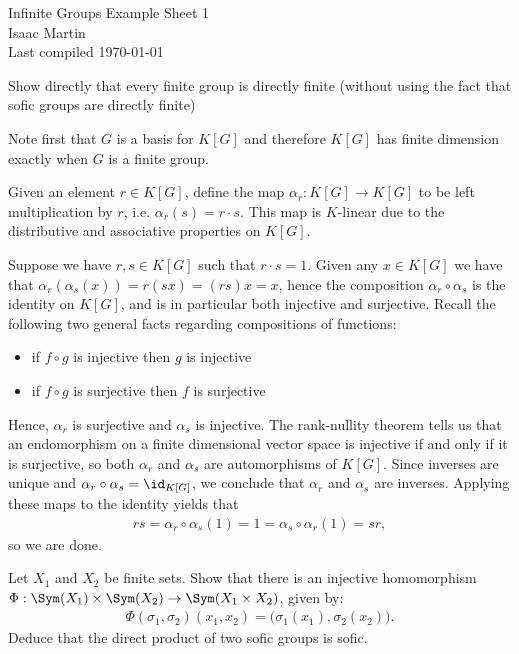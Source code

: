 


\pagestyle{empty}
	\LARGE
\begin{center}
	Infinite Groups Example Sheet 1 \\
	\Large
	Isaac Martin \\
    Last compiled \today
\end{center}
\normalsize
\vspace{-2mm}
\hru
{}
\begin{homework}[e]
	\prob Show directly that every finite group is directly finite (without using the fact that sofic groups are directly finite)
	\begin{prf}
		Note first that $G$ is a basis for $K[G]$ and therefore $K[G]$ has finite dimension exactly when $G$ is a finite group.

		Given an element $r \in K[G]$, define the map $\alpha_r:K[G]\to K[G]$ to be left multiplication by $r$, i.e. $\alpha_r(s) = r\cdot s$. This map is $K$-linear due to the distributive and associative properties on $K[G]$. 

		Suppose we have  $r,s\in K[G]$ such that $r\cdot s = 1$. Given any $x \in K[G]$ we have that $\alpha_r(\alpha_s(x)) = r(sx) = (rs)x = x$, hence the composition $\alpha_r\circ \alpha_s$ is the identity on $K[G]$, and is in particular both injective and surjective. Recall the following two general facts regarding compositions of functions:
		\begin{itemize}
			\item if $f\circ g$ is injective then $g$ is injective
			\item if $f\circ g$ is surjective then $f$ is surjective
		\end{itemize}
		Hence, $\alpha_r$ is surjective and $\alpha_s$ is injective. The rank-nullity theorem tells us that an endomorphism on a finite dimensional vector space is injective if and only if it is surjective, so both $\alpha_r$ and $\alpha_s$ are automorphisms of  $K[G]$. Since inverses are unique and $\alpha_r \circ \alpha_s = \id_{K[G]}$, we conclude that $\alpha_r$ and $\alpha_s$ are inverses. Applying these maps to the identity yields that
		\begin{align*}
			rs = \alpha_r\circ\alpha_s(1) = 1 = \alpha_s\circ\alpha_r(1) = sr,
		\end{align*}
		so we are done.
	\end{prf}

	\prob Let $X_1$ and $X_2$ be finite sets. Show that there is an injective homomorphism $\Phi:\Sym(X_1)\times \Sym(X_2)\to \Sym(X_1\times X_2)$, given by:
	\begin{align*}
		\Phi(\sigma_1, \sigma_2)(x_1,x_2) = \big(\sigma_1(x_1), \sigma_2(x_2)\big).
	\end{align*}
	Deduce that the direct product of two sofic groups is sofic.
	

\end{homework}
